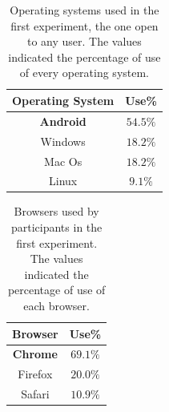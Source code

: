 \documentclass{article}
\begin{document}



\clearpage

\setlength{\tabcolsep}{10pt}
\begin{table}
\caption{Operating systems used in the first experiment, the one open to any user. The values indicated the percentage of use of every operating system.}
\label{tab:ooss-first-experiment}
\begin{center}
\begin{tabular}{cc}
{\bf Operating System} & {\bf Use\%} \\
\hline
\bf Android & $\mathbf{54.5\%}$ \\
Windows & $18.2\%$ \\
Mac Os & $18.2\%$ \\
Linux & $9.1\%$ \\
\hline
\end{tabular}
\end{center}
\end{table}


\clearpage

\setlength{\tabcolsep}{10pt}
\begin{table}
\caption{Browsers used by participants in the first experiment. The values indicated the percentage of use of each browser.}
\label{tab:browsers-first-experiment}
\begin{center}
\begin{tabular}{cc}
{\bf Browser} & {\bf Use\%} \\
\hline
\bf Chrome & $\mathbf{69.1\%}$ \\
Firefox & $20.0\%$ \\
Safari & $10.9\%$ \\
\hline
\end{tabular}
\end{center}
\end{table}


\clearpage
\end{document}
